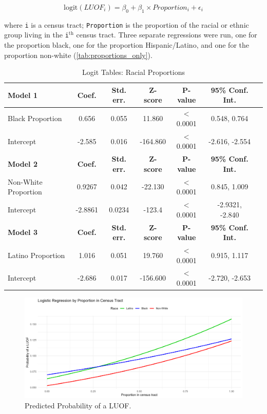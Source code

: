 \documentclass[12pt]{article}
\begin{document}
\begin{equation}
\text{logit}(LUOF_{i})=\beta_{0} + \beta_{1} \times Proportion_{i} + \epsilon_{i}
\end{equation}

\noindent{}where \texttt{i} is a census tract; \texttt{Proportion} is the proportion of the racial or ethnic group living in the \texttt{i}$^\text{th}$ census tract. Three separate regressions were run, one for the proportion black, one for the proportion Hispanic/Latino, and one for the proportion non-white (\autoref{tab:proportions_only}).

\begin{table}[ht]
\centering
\begin{tabular}{lcccccc}
\toprule
\textbf{Model 1} & \textbf{Coef.} & \textbf{Std. err.} & \textbf{Z-score} & \textbf{P-value} & \textbf{95\% Conf. Int.} \\
\midrule
Black Proportion & 0.656 & 0.055 & 11.860 & $<$0.0001 & 0.548, 0.764 \\
Intercept & -2.585 & 0.016 & -164.860 & $<$0.0001 & -2.616, -2.554 \\
\midrule
\textbf{Model 2} & \textbf{Coef.} & \textbf{Std. err.} & \textbf{Z-score} & \textbf{P-value} & \textbf{95\% Conf. Int.} \\
\midrule
Non-White Proportion & 0.9267 & 0.042 & -22.130 & $<$0.0001 & 0.845, 1.009 \\
Intercept & -2.8861 & 0.0234 & -123.4 & $<$0.0001 & -2.9321, -2.840 \\
\midrule
\textbf{Model 3} & \textbf{Coef.} & \textbf{Std. err.} & \textbf{Z-score} & \textbf{P-value} & \textbf{95\% Conf. Int.} \\
\midrule
Latino Proportion & 1.016 & 0.051 & 19.760 & $<$0.0001 & 0.915, 1.117 \\
Intercept & -2.686 & 0.017 & -156.600 & $<$0.0001 & -2.720, -2.653 \\
\bottomrule
\end{tabular}
\caption{Logit Tables: Racial Proportions}
\label{tab:proportions_only}
\end{table}

\begin{figure}[H]
  \centering %
  \includegraphics[width=\linewidth]{images/race_proportions_logit}
  \captionsetup{justification=centering, singlelinecheck=false, margin=2cm}
  \caption[Predicted Probability of a LUOF (Race Only)]{Predicted Probability of a LUOF.}
  \label{fig:logit_race_propor}
\end{figure}
\end{document}
